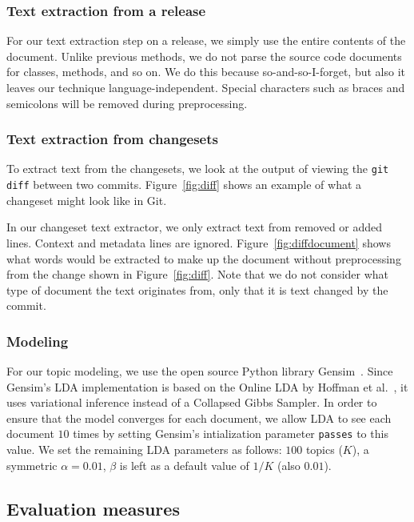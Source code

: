 \subsubsection{Text extraction from a release}

For our text extraction step on a release,
we simply use the entire contents of the document.
Unlike previous methods\needcite,
we do not parse the source code documents for classes, methods, and so on.
We do this because so-and-so-I-forget\needcite,
but also it leaves our technique language-independent.
Special characters such as braces and semicolons will be removed during
preprocessing.

\subsubsection{Text extraction from changesets}


To extract text from the changesets, we look at the output of viewing
the \texttt{git diff} between two commits.
Figure~\ref{fig:diff} shows an example of what a changeset might look
like in Git.

In our changeset text extractor, we only extract text from removed or added lines.
Context and metadata lines are ignored.
Figure~\ref{fig:diffdocument} shows what words would be extracted to make up the document without preprocessing
from the change shown in Figure~\ref{fig:diff}.
Note that we do not consider what type of document the text originates from,
only that it is text changed by the commit.

\subsubsection{Modeling}

For our topic modeling, we use the open source Python library Gensim~\cite{Gensim}.
Since Gensim's LDA implementation is based on the
Online LDA by Hoffman et al.~\cite{Hoffman-etal:2010},
it uses variational inference instead of a Collapsed Gibbs Sampler.
In order to ensure that the model converges for each document,
we allow LDA to see each document $10$ times by setting
Gensim's intialization parameter \texttt{passes} to this value.
We set the remaining LDA parameters as follows:
$100$ topics ($K$),
a symmetric $\alpha=0.01$,
$\beta$ is left as a default value of $1/K$ (also $0.01$).


\subsection{Evaluation measures}

